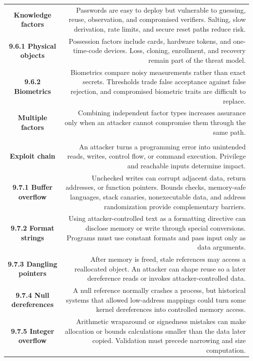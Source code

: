 \documentclass[10pt,letterpaper]{article}
\begin{document}
\begin{longtable}{C N}
\\*\hline
\textbf{Knowledge factors} & Passwords are easy to deploy but vulnerable to guessing, reuse, observation, and compromised verifiers. Salting, slow derivation, rate limits, and secure reset paths reduce risk.\\\hline
\textbf{9.6.1 Physical objects} & Possession factors include cards, hardware tokens, and one-time-code devices. Loss, cloning, enrollment, and recovery remain part of the threat model.\\\hline
\textbf{9.6.2 Biometrics} & Biometrics compare noisy measurements rather than exact secrets. Thresholds trade false acceptance against false rejection, and compromised biometric traits are difficult to replace.\\\hline
\textbf{Multiple factors} & Combining independent factor types increases assurance only when an attacker cannot compromise them through the same path.\\\hline
{}\\*\hline
\textbf{Exploit chain} & An attacker turns a programming error into unintended reads, writes, control flow, or command execution. Privilege and reachable inputs determine impact.\\\hline
\textbf{9.7.1 Buffer overflow} & Unchecked writes can corrupt adjacent data, return addresses, or function pointers. Bounds checks, memory-safe languages, stack canaries, nonexecutable data, and address randomization provide complementary barriers.\\\hline
\textbf{9.7.2 Format strings} & Using attacker-controlled text as a formatting directive can disclose memory or write through special conversions. Programs must use constant formats and pass input only as data arguments.\\\hline
\textbf{9.7.3 Dangling pointers} & After memory is freed, stale references may access a reallocated object. An attacker can shape reuse so a later dereference reads or invokes attacker-controlled data.\\\hline
\textbf{9.7.4 Null dereferences} & A null reference normally crashes a process, but historical systems that allowed low-address mappings could turn some kernel dereferences into controlled memory access.\\\hline
\textbf{9.7.5 Integer overflow} & Arithmetic wraparound or signedness mistakes can make allocation or bounds calculations smaller than the data later copied. Validation must precede narrowing and size computation.\\\hline

\end{longtable}
\end{document}
